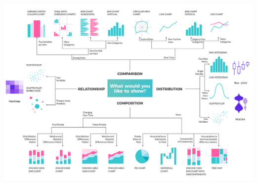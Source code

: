 \documentclass[aspectratio=169]{beamer}
\begin{document}
\begin{frame}[c]
    
\vspace{-1pt}
\centering
\includegraphics[height=\paperheight]{figures/types_of_charts.png}


\end{frame}




    



\end{document}
